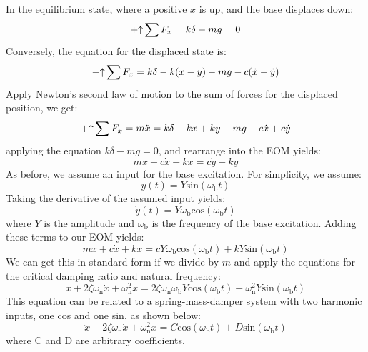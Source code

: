 \documentclass[12pt,letter]{article}
\begin{document}
  In the equilibrium state, where a positive $x$ is up, and the base displaces down:
 \begin{equation}
 \mathbin{+\mathord\uparrow} \sum F_x = k\delta -mg =0
 \end{equation} 
 Conversely, the equation for the displaced state is:
 \begin{equation}
 \mathbin{+\mathord\uparrow} \sum F_x = k\delta -k(x - y) -mg -c(\dot{x} -\dot{y})
 \end{equation} 
 Apply Newton's second law of motion to the sum of forces for the displaced position, we get:
 \begin{equation}
 \mathbin{+\mathord\uparrow} \sum F_x = m\ddot{x} = k\delta -kx + ky -mg -c\dot{x} +c\dot{y}
 \end{equation} 
 applying the equation $k\delta -mg =0$, and rearrange into the EOM yields: 
 \begin{equation}
 m\ddot{x} + c\dot{x} + kx = c\dot{y} + ky 
 \end{equation}
 As before, we assume an input for the base excitation. For simplicity, we assume:
 \begin{equation}
 y(t) = Y\text{sin}(\omega_\text{b} t)
 \label{eq:Ysinomegat}
 \end{equation}
 Taking the derivative of the assumed input yields:
 \begin{equation}
 \dot{y}(t) = Y \omega_\text{b} \text{cos}(\omega_\text{b} t)
 \end{equation}
 where $Y$ is the amplitude and $\omega_\text{b}$ is the frequency of the base excitation. Adding these terms to our EOM yields:
 \begin{equation}
 m\ddot{x} + c\dot{x} + kx = c Y \omega_\text{b} \text{cos}(\omega_\text{b} t)  + k Y\text{sin}(\omega_\text{b} t)  
 \end{equation}
 We can get this in standard form if we divide by $m$ and apply the equations for the critical damping ratio and natural frequency:
 \begin{equation}
 \ddot{x} + 2 \zeta \omega_\text{n} \dot{x} + \omega_\text{n}^2x = 2 \zeta \omega_\text{n} \omega_\text{b} Y \text{cos}(\omega_\text{b} t)  + \omega_\text{n}^2 Y\text{sin}(\omega_\text{b} t)
 \label{eq:standard_form_base_excitation}  
 \end{equation}
 This equation can be related to a spring-mass-damper system with two harmonic inputs, one cos and one sin, as shown below:
 \begin{equation}
 \ddot{x} + 2 \zeta \omega_\text{n} \dot{x} + \omega_\text{n}^2x = C \text{cos}(\omega_\text{b} t)  + D \text{sin}(\omega_\text{b} t)  
 \label{eq:standard_form_base_excitation_CD}
 \end{equation}
 where C and D are arbitrary coefficients. 
\end{document}
